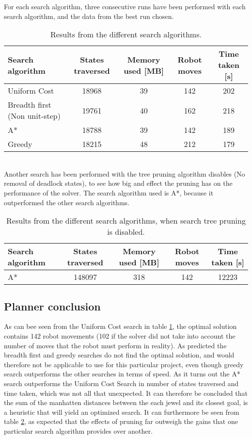 For each search algorithm, three consecutive runs have been performed with each search algorithm, and the data from the best run chosen.\\

\begin{table}[h!]
	\centering
	\begin{tabular}{| l | c | c | c | c | }
		\hline
			Search algorithm	& States traversed & Memory used [MB] & Robot moves & Time taken [s]\\ \hline
	    	Uniform Cost & 18968 			& 39 		 & 142 	& 202\\\hline
		    Breadth first (Non unit-step)	& 19761 			& 40 		 & 162 	& 218\\\hline
		    A*		& 18788 			& 39 		 & 142 	& 189 \\\hline
	    	Greedy 		& 18215 			& 48 		 & 212 	& 179 \\
		\hline
	\end{tabular}
	\label{tbl:searchresults}
	\caption{Results from the different search algorithms.}
\end{table}
\\
Another search has been performed with the tree pruning algorithm disables (No removal of deadlock states), to see how big and effect the pruning has on the performance of the solver. The search algorithm used is A*, because it outperformed the other search algorithms.\\
\begin{table}[h!]
	\centering
	\begin{tabular}{| l | c | c | c | c | }
		\hline
			Search algorithm	& States traversed & Memory used [MB] & Robot moves & Time taken [s]\\ \hline
		    A*		& 148097 			& 318 		 & 142 	& 12223 \\
		\hline
	\end{tabular}
	\label{tbl:searchresultsnoprun}
	\caption{Results from the different search algorithms, when search tree pruning is disabled.}
\end{table}


\subsection{Planner conclusion}
As can bee seen from the Uniform Cost search in table \ref{tbl:searchresults}, the optimal solution contains 142 robot movements (102 if the solver did not take into account the number of moves that the robot must perform in reality). As predicted the breadth first and greedy searches do not find the optimal solution, and would therefore not be applicable to use for this particular project, even though greedy search outperforms the other searches in terms of speed. As it turns out the A* search outperforms the Uniform Cost Search in number of states traversed and time taken, which was not all that unexpected. It can therefore be concluded that the sum of the manhatten distances between the each jewel and its closest goal, is a heuristic that will yield an optimized search. It can furthermore be seen from table \ref{tbl:searchresultsnoprun}, as expected that the effects of pruning far outweigh the gains that one particular search algorithm provides over another.
